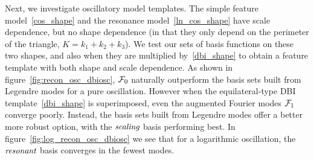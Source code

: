 Next, we investigate oscillatory model templates.
The simple feature model~\eqref{cos_shape} and the resonance model~\eqref{ln_cos_shape}
have scale dependence, but no shape dependence (in that they only depend on the perimeter
of the triangle, $K=k_1+k_2+k_3$).
We test our sets of basis functions on these two shapes,
and also when they are multiplied by~\eqref{dbi_shape} to obtain a feature
template with both shape and scale dependence.
As shown in figure~\ref{fig:recon_osc_dbiosc},
$\mathcal{F}_0$ naturally outperform the basis sets built from Legendre modes for a pure oscillation.
However when the equilateral-type DBI template~\eqref{dbi_shape} is superimposed, even the augmented Fourier modes
$\mathcal{F}_1$ converge poorly. Instead, the basis sets built from Legendre modes offer a better more robust option,
with the $\textit{scaling}$ basis performing best.
In figure~\ref{fig:log_recon_osc_dbiosc} we see that for a logarithmic
oscillation, the $\textit{resonant}$ basis converges in the fewest modes.



